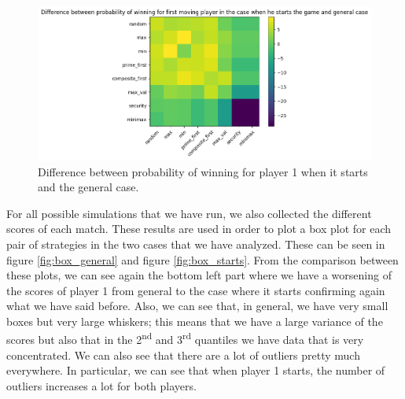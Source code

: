 \begin{figure}
    \centering
    \includegraphics[width=1\linewidth]{img/diff_prob.png}
    \caption{Difference between probability of winning for player 1 when it starts and the general case.}
    \label{fig:diff_prob}
\end{figure}

For all possible simulations that we have run, we also collected the different scores of each match. These results are used in order to plot a box plot for each pair of strategies in the two cases that we have analyzed. These can be seen in figure \ref{fig:box_general} and figure \ref{fig:box_starts}.
From the comparison between these plots, we can see again the bottom left part where we have a worsening of the scores of player 1 from general to the case where it starts confirming again what we have said before. 
Also, we can see that, in general, we have very small boxes but very large whiskers; this means that we have a large variance of the scores but also that in the 2\textsuperscript{nd} and 3\textsuperscript{rd} quantiles we have data that is very concentrated. We can also see that there are a lot of outliers pretty much everywhere. In particular, we can see that when player 1 starts, the number of outliers increases a lot for both players.

